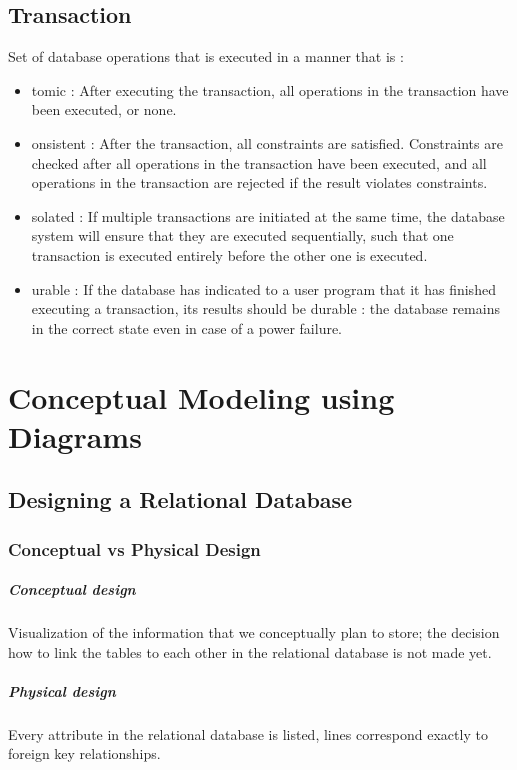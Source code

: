 \section{Transaction}

Set of database operations that is executed in a manner that is  :
\begin{itemize}
    \item {}tomic : After executing the transaction, all operations in the transaction have been executed, or none.
    \item {}onsistent : After the transaction, all constraints are satisfied. Constraints are checked after all operations in the transaction have been executed, and all operations in the transaction are rejected if the result violates constraints.
    \item {}solated : If multiple transactions are initiated at the same time, the database system will ensure that they are executed sequentially, such that one transaction is executed entirely before the other one is executed.
    \item {}urable : If the database has indicated to a user program that it has finished executing a transaction, its results should be durable : the database remains in the correct state even in case of a power failure.
\end{itemize}

\chapter{Conceptual Modeling using Diagrams}

\section{Designing a Relational Database}

\subsection{Conceptual vs Physical Design}

\begin{minipage}[t]{0.48\textwidth}
\paragraph*{Conceptual design}
Visualization of the information that we conceptually plan to store; the decision how to link the tables to each other in the relational database is not made yet.
\end{minipage}
\hfill
\begin{minipage}[t]{0.48\textwidth}
\paragraph*{Physical design}
Every attribute in the relational database is listed, lines correspond exactly to foreign key relationships.
\end{minipage}

